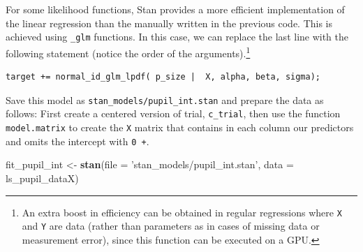 \documentclass[12pt,]{krantz}
\newenvironment{Shaded}{\begin{snugshade}}{\end{snugshade}}
\newcommand{\KeywordTok}[1]{\textcolor[rgb]{0.13,0.29,0.53}{\textbf{#1}}}
\newcommand{\DataTypeTok}[1]{\textcolor[rgb]{0.13,0.29,0.53}{#1}}
\newcommand{\DecValTok}[1]{\textcolor[rgb]{0.00,0.00,0.81}{#1}}
\newcommand{\StringTok}[1]{\textcolor[rgb]{0.31,0.60,0.02}{#1}}
\newcommand{\OperatorTok}[1]{\textcolor[rgb]{0.81,0.36,0.00}{\textbf{#1}}}
\newcommand{\NormalTok}[1]{#1}
\theoremstyle{definition}
\theoremstyle{definition}
\theoremstyle{definition}
\theoremstyle{remark}
\begin{document}
For some likelihood functions, Stan provides a more efficient
implementation of the linear regression than the manually written in the
previous code. This is achieved using \texttt{\_glm} functions. In this
case, we can replace the last line with the following statement (notice
the order of the arguments).\footnote{An extra boost in efficiency can
  be obtained in regular regressions where \texttt{X} and \texttt{Y} are
  data (rather than parameters as in cases of missing data or
  measurement error), since this function can be executed on a GPU.}

\begin{verbatim}
target += normal_id_glm_lpdf( p_size |  X, alpha, beta, sigma);
\end{verbatim}

Save this model as \texttt{stan\_models/pupil\_int.stan} and prepare the
data as follows: First create a centered version of trial,
\texttt{c\_trial}, then use the function \texttt{model.matrix} to create
the \texttt{X} matrix that contains in each column our predictors and
omits the intercept with \texttt{0\ +}.

\begin{Shaded}
\end{Shaded}

\begin{Shaded}
\begin{Highlighting}[]
\NormalTok{fit_pupil_int <-}\StringTok{ }\KeywordTok{stan}\NormalTok{(}\DataTypeTok{file =} \StringTok{'stan_models/pupil_int.stan'}\NormalTok{,}
                      \DataTypeTok{data =}\NormalTok{ ls_pupil_dataX)}
\end{Highlighting}
\end{Shaded}
\end{document}
